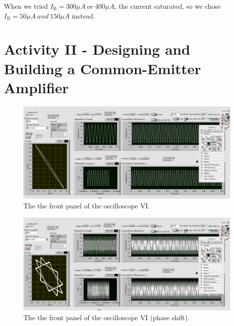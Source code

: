 \documentclass[11pt]{article}
\begin{document}
When we tried $I_{\mathrm{B}}=300 \mu A \ or \ 400 \mu A$, the current saturated, so we chose $I_{\mathrm{B}}=50 \mu A \ and \ 150 \mu A$ instead.



\section{Activity II - Designing and Building a Common-Emitter Amplifier}


\begin{figure}[H]
 \begin{center}
  \includegraphics[width=\linewidth/1]{act2}
  \caption{The the front panel of the oscilloscope VI.}
  \label{fig:act2}
 \end{center}
\end{figure}

\begin{figure}[H]
 \begin{center}
  \includegraphics[width=\linewidth/1]{act2phaseshift}
  \caption{The the front panel of the oscilloscope VI (phase shift).}
  \label{fig:act2phaseshift}
 \end{center}
\end{figure}
\end{document}
